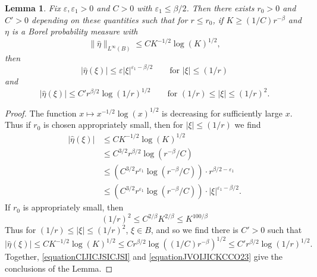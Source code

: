 \documentclass[dvipsnames,letterpaper,12pt]{article}
\numberwithin{equation}{section}
\newtheorem{lemma}[theorem]{Lemma}
\numberwithin{theorem}{section}
\begin{document}
\begin{lemma} \label{remarkGGIVJIS}
    Fix $\varepsilon,\varepsilon_1 > 0$ and $C > 0$ with $\varepsilon_1 \leq \beta/2$. Then there exists $r_0 > 0$ and $C' > 0$ depending on these quantities such that for $r \leq r_0$, if $K \geq (1/C) r^{-\beta}$ and $\eta$ is a Borel probability measure with
    \begin{equation}
        \| \widehat{\eta} \|_{L^\infty(B)} \leq C K^{-1/2} \log(K)^{1/2},
    \end{equation}
    then
    \[ |\widehat{\eta}(\xi)| \leq \varepsilon |\xi|^{\varepsilon_1 - \beta/2} \quad\quad \text{for $|\xi| \leq (1/r)$} \]
    and
    \[ |\widehat{\eta}(\xi)| \leq C' r^{\beta/2} \log(1/r)^{1/2} \quad\quad \text{for $(1/r) \leq |\xi| \leq (1/r)^{2}$}. \]
\end{lemma}
\begin{proof}
    The function $x \mapsto x^{-1/2} \log(x)^{1/2}$ is decreasing for sufficiently large $x$. Thus if $r_0$ is chosen appropriately small, then for $|\xi| \leq (1/r)$ we find
    \begin{equation} \label{equationCIJICJSICJSI}
    \begin{split}
        |\widehat{\eta}(\xi)| &\leq C K^{-1/2} \log(K)^{1/2}\\
        &\leq C^{3/2} r^{\beta/2} \log(r^{-\beta}/C)\\
        &\leq \left( C^{3/2} r^{\varepsilon_1} \log(r^{-\beta}/C) \right) \cdot r^{\beta/2 - \varepsilon_1}\\
        &\leq \left( C^{3/2} r^{\varepsilon_1} \log(r^{-\beta}/C) \right) \cdot |\xi|^{\varepsilon_1 - \beta/2}.
    \end{split}
    \end{equation}
    If $r_0$ is appropriately small, then
    \begin{equation}
        (1/r)^2 \leq C^{2/\beta} K^{2/\beta} \leq K^{100/\beta}
    \end{equation}
    Thus for $(1/r) \leq |\xi| \leq (1/r)^2$, $\xi \in B$, and so we find there is $C' > 0$ such that
    \begin{equation} \label{equationJVOIJICKCCO23}
        |\widehat{\eta}(\xi)| \leq C K^{-1/2} \log(K)^{1/2} \leq C r^{\beta/2} \log((1/C) r^{-\beta})^{1/2} \leq C' r^{\beta/2} \log(1/r)^{1/2}.
    \end{equation}
    Together, \eqref{equationCIJICJSICJSI} and \eqref{equationJVOIJICKCCO23} give the conclusions of the Lemma.
\end{proof}
\end{document}
